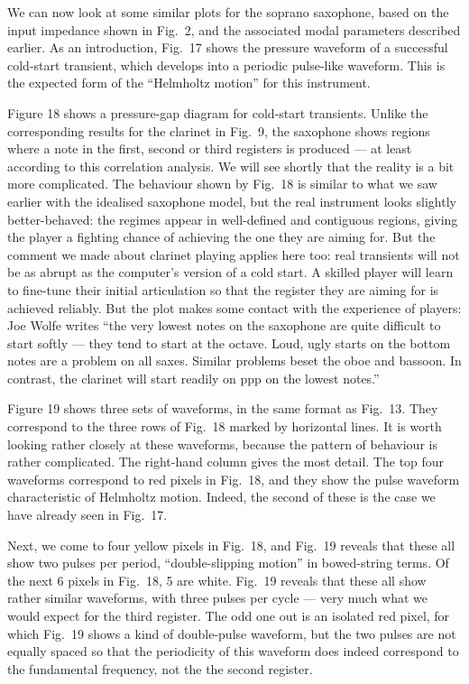
  We can now look at some similar plots for the soprano saxophone, based on the 
  input impedance shown in Fig.\ 2, and the associated modal parameters 
  described earlier. As an introduction, Fig.\ 17 shows the pressure waveform 
  of a successful cold-start transient, which develops into a periodic 
  pulse-like waveform. This is the expected form of the “Helmholtz motion” for 
  this instrument. 

  Figure 18 shows a pressure-gap diagram for cold-start transients. Unlike the 
  corresponding results for the clarinet in Fig.\ 9, the saxophone shows 
  regions where a note in the first, second or third registers is produced — at 
  least according to this correlation analysis. We will see shortly that the 
  reality is a bit more complicated. The behaviour shown by Fig.\ 18 is similar 
  to what we saw earlier with the idealised saxophone model, but the real 
  instrument looks slightly better-behaved: the regimes appear in well-defined 
  and contiguous regions, giving the player a fighting chance of achieving the 
  one they are aiming for. But the comment we made about clarinet playing 
  applies here too: real transients will not be as abrupt as the computer’s 
  version of a cold start. A skilled player will learn to fine-tune their 
  initial articulation so that the register they are aiming for is achieved 
  reliably. But the plot makes some contact with the experience of players: Joe 
  Wolfe writes ``the very lowest notes on the saxophone are quite difficult to 
  start softly --- they tend to start at the octave. Loud, ugly starts on the 
  bottom notes are a problem on all saxes. Similar problems beset the oboe and 
  bassoon. In contrast, the clarinet will start readily on ppp on the lowest 
  notes.'' 

  Figure 19 shows three sets of waveforms, in the same format as Fig.\ 13. They 
  correspond to the three rows of Fig.\ 18 marked by horizontal lines. It is 
  worth looking rather closely at these waveforms, because the pattern of 
  behaviour is rather complicated. The right-hand column gives the most detail. 
  The top four waveforms correspond to red pixels in Fig.\ 18, and they show 
  the pulse waveform characteristic of Helmholtz motion. Indeed, the second of 
  these is the case we have already seen in Fig.\ 17. 

  Next, we come to four yellow pixels in Fig.\ 18, and Fig.\ 19 reveals that 
  these all show two pulses per period, “double-slipping motion” in 
  bowed-string terms. Of the next 6 pixels in Fig.\ 18, 5 are white. Fig.\ 19 
  reveals that these all show rather similar waveforms, with three pulses per 
  cycle — very much what we would expect for the third register. The odd one 
  out is an isolated red pixel, for which Fig.\ 19 shows a kind of double-pulse 
  waveform, but the two pulses are not equally spaced so that the periodicity 
  of this waveform does indeed correspond to the fundamental frequency, not the 
  the second register. 

